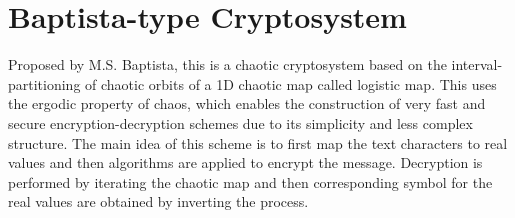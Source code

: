 \section{Baptista-type Cryptosystem}
Proposed by M.S. Baptista, this is a chaotic cryptosystem based on the interval- partitioning of chaotic orbits of a 1D chaotic map called logistic map. This uses the ergodic property of chaos, which enables the construction of very fast and secure encryption-decryption schemes due to its simplicity and less complex structure. The main idea of this scheme is to first map the text characters to real values and then algorithms are applied to encrypt the message. Decryption is performed by iterating the chaotic map and then corresponding symbol for the real values are obtained by inverting the process.

